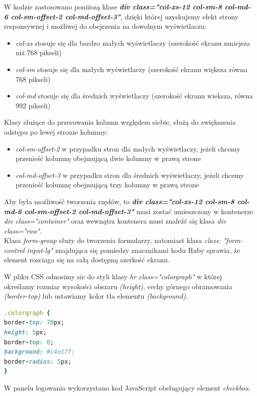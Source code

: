 \documentclass[openright]{xmgr}
\begin{document}
W kodzie zastosowano poniższą klase \textbf{\textit{div class="col-xs-12 col-sm-8 col-md-6 col-sm-offset-2 col-md-offset-3"}}, dzięki której uzyskujemy efekt strony responsywnej \cite{css} i możliwej do obejrzenia na dowolnym wyświetlaczu:
\begin{itemize}
	\item
\textit{col-xs} stosuje się dla bardzo małych wyświetlaczy (szerokość ekranu mniejsza niż 768 pikseli)
\item
\textit{col-sm} stosuje się dla małych wyświetlaczy (szerokość ekranu większa równa 768 pikseli)
\item
\textit{col-md} stosuje się dla średnich wyświetlaczy (szerokość ekranu wieksza, równa 992 pikseli)\\
\end{itemize}
\newpage
Klasy służące do przesuwania kolumn względem siebie, służą do zwiększenia odstępu po lewej stronie kolumny:
\begin{itemize}
\item
\textit{col-sm-offset-2} w przypadku stron dla małych wyświetlaczy, jeżeli chcemy przenieść kolumnę obejmującą dwie kolumny w prawą strone
\item
\textit{col-md-offset-3} w przypadku stron dla średnich wyświetlaczy, jeżeli chcemy przenieść kolumnę obejmującą trzy kolumny w prawą strone
\end{itemize}

\indent Aby była możliwość tworzenia rzędów, to \textbf{\textit{div class="col-xs-12 col-sm-8 col-md-6 col-sm-offset-2 col-md-offset-3"}} musi zostać umieszczony w kontenerze \textit{div class="container"} oraz wewnątrz kontenera musi znaleźć się klasa \textit{div class="row"}.\\

Klasa \textit{form-group} służy do tworzenia formularzy, natomiast klasa \textit{class: "form-control input-lg"} znajdująca się pomiedzy znacznikami kodu Ruby sprawia, że element rozciaga się na całą dostępną szerkość ekranu.

W pliku CSS odnosimy sie do styli klasy  \textit{hr class="colorgraph"} w której określamy rozmiar wysokości obszaru \textit{(height)}, cechy górnego obramowania \textit{(border-top)} lub ustawiamy kolor tła elementu \textit{(background)}.
\begin{lstlisting}[language=Ruby,lineskip={-1pt},caption=Kod CSS dla panelu logowania]
.colorgraph {
border-top: 70px;
height: 5px;
border-top: 0;
background: #c4e17f;
border-radius: 5px;
}
\end{lstlisting}
\newpage
W panelu logowania wykorzystano kod JavaScript obsługujący element \textit{checkbox}.\\
\end{document}
